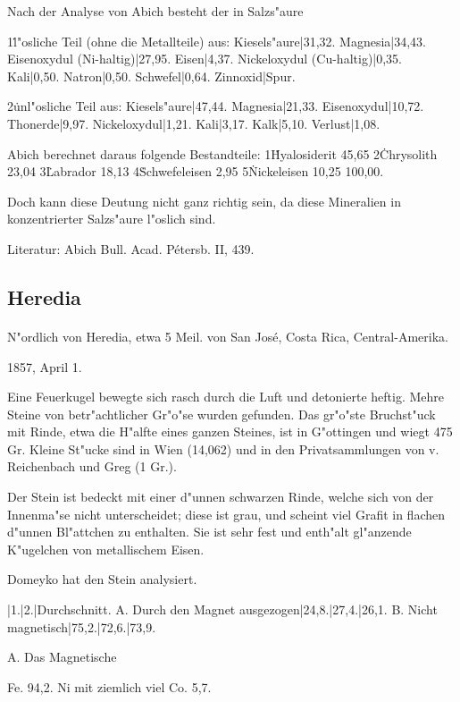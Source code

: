 \documentclass[a4paper, 11pt, oneside]{article}
\begin{document}
Nach der Analyse von Abich besteht der in Salzs"aure

1\. l"osliche Teil (ohne die Metallteile) aus:  
Kiesels"aure|31,32.  
Magnesia|34,43.  
Eisenoxydul (Ni-haltig)|27,95.  
Eisen|4,37.  
Nickeloxydul (Cu-haltig)|0,35.  
Kali|0,50.  
Natron|0,50.  
Schwefel|0,64.  
Zinnoxid|Spur.

2\. unl"osliche Teil aus:
Kiesels"aure|47,44.  
Magnesia|21,33.  
Eisenoxydul|10,72.  
Thonerde|9,97.  
Nickeloxydul|1,21.  
Kali|3,17.  
Kalk|5,10.  
Verlust|1,08.

Abich berechnet daraus folgende Bestandteile:
1\. Hyalosiderit 45,65  
2\. Chrysolith  23,04  
3\. Labrador 18,13  
4\. Schwefeleisen 2,95  
5\. Nickeleisen 10,25  
100,00.

Doch kann diese Deutung nicht ganz richtig sein, da diese Mineralien in konzentrierter Salzs"aure l"oslich sind.

\footnotesize
Literatur: Abich Bull. Acad. Pétersb. II, 439.

\subsection{Heredia}
\normalsize
\paragraph{}
N"ordlich von Heredia, etwa 5 Meil. von San José, Costa Rica, Central-Amerika.

1857, April 1.

Eine Feuerkugel bewegte sich rasch durch die Luft und detonierte heftig. Mehre Steine von betr"achtlicher Gr"o"se wurden gefunden. Das gr"o"ste Bruchst"uck mit Rinde, etwa die H"alfte eines ganzen Steines, ist in G"ottingen und wiegt 475 Gr. Kleine St"ucke sind in Wien (14,062) und in den Privatsammlungen von v. Reichenbach und Greg (1 Gr.).

Der Stein ist bedeckt mit einer d"unnen schwarzen Rinde, welche sich von der Innenma"se nicht unterscheidet; diese ist grau, und scheint viel Grafit in flachen d"unnen Bl"attchen zu enthalten. Sie ist sehr fest und enth"alt gl"anzende K"ugelchen von metallischem Eisen.

Domeyko hat den Stein analysiert.

|1.|2.|Durchschnitt.
A. Durch den Magnet ausgezogen|24,8.|27,4.|26,1.  
B. Nicht magnetisch|75,2.|72,6.|73,9.

A. Das Magnetische

Fe. 94,2.  
Ni mit ziemlich viel Co. 5,7.
\end{document}
